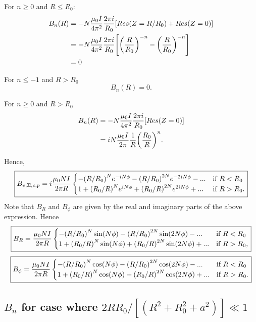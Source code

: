 \documentclass{article}
\begin{document}
For $n\ge0$ and $R \le R_0$:
\[\begin{aligned}
B_{n}(R) &= -N\frac{\mu_0I}{4\pi^2}\frac{2\pi i}{R_0}\qty[Res(Z=R/R_0) + Res(Z=0)] \\
&= -N\frac{\mu_0I}{4\pi^2}\frac{2\pi i}{R_0}\qty[\qty(\frac{R}{R_0})^{-n} - \qty(\frac{R}{R_0})^{-n} ] \\
&= 0
\end{aligned}\]

For $n\le-1$ and $R> R_0$
\[B_{n}(R) = 0.\]

For $n\ge 0$ and $R> R_0$
\[\begin{aligned}
B_{n}(R) &= -N\frac{\mu_0I}{4\pi^2}\frac{2\pi i}{R_0}\qty[Res(Z=0)] \\
&= iN\frac{\mu_0I}{2\pi}\frac{1}{R}\qty(\frac{R_0}{R})^n.
\end{aligned}\]

Hence,
\[\boxed{B_{v,\Sigma,c,p} = i\frac{\mu_0NI}{2\pi R}\begin{cases}
-\qty(R/R_0)^Ne^{-iN\phi} - \qty(R/R_0)^{2N}e^{-2iN\phi} - ... & \text{if } R<R_0\\
1 + \qty(R_0/R)^Ne^{iN\phi} + \qty(R_0/R)^{2N}e^{2iN\phi} + ... & \text{if } R>R_0.\\
\end{cases}}\]
Note that $B_R$ and $B_\phi$ are given by the real and imaginary parts of the above expression. Hence
\[\boxed{B_R = \frac{\mu_0NI}{2\pi R}\begin{cases}
-\qty(R/R_0)^N\sin(N\phi) - \qty(R/R_0)^{2N}\sin(2N\phi) - ... & \text{if } R<R_0\\
1 + \qty(R_0/R)^N\sin(N\phi) + \qty(R_0/R)^{2N}\sin(2N\phi) + ... & \text{if } R>R_0,\\
\end{cases}}\]
\[\boxed{B_\phi = \frac{\mu_0NI}{2\pi R}\begin{cases}
-\qty(R/R_0)^N\cos(N\phi) - \qty(R/R_0)^{2N}\cos(2N\phi) - ... & \text{if } R<R_0\\
1 + \qty(R_0/R)^N\cos(N\phi) + \qty(R_0/R)^{2N}\cos(2N\phi) + ... & \text{if } R>R_0.\\
\end{cases}}\]


\subsection{$B_{n}$ for case where $2RR_0/[(R^2+R_0^2+a^2)]\ll1$}
\end{document}

